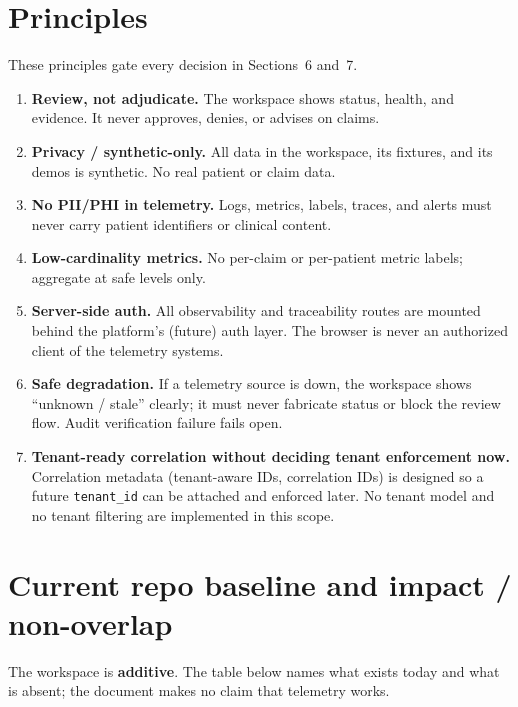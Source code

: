 \documentclass[11pt]{article}
\newcommand{\code}[1]{\texttt{#1}}
\begin{document}
\section{Principles}

These principles gate every decision in Sections~6 and~7.

\begin{enumerate}
\item \textbf{Review, not adjudicate.} The workspace shows status, health,
      and evidence. It never approves, denies, or advises on claims.
\item \textbf{Privacy / synthetic-only.} All data in the workspace, its
      fixtures, and its demos is synthetic. No real patient or claim data.
\item \textbf{No PII/PHI in telemetry.} Logs, metrics, labels, traces, and
      alerts must never carry patient identifiers or clinical content.
\item \textbf{Low-cardinality metrics.} No per-claim or per-patient metric
      labels; aggregate at safe levels only.
\item \textbf{Server-side auth.} All observability and traceability routes are
      mounted behind the platform's (future) auth layer. The browser is never
      an authorized client of the telemetry systems.
\item \textbf{Safe degradation.} If a telemetry source is down, the workspace
      shows ``unknown / stale'' clearly; it must never fabricate status or
      block the review flow. Audit verification failure fails open.
\item \textbf{Tenant-ready correlation without deciding tenant enforcement
      now.} Correlation metadata (tenant-aware IDs, correlation IDs) is
      designed so a future \code{tenant\_id} can be attached and enforced
      later. No tenant model and no tenant filtering are implemented in this
      scope.
\end{enumerate}

\section{Current repo baseline and impact / non-overlap}

The workspace is \textbf{additive}. The table below names what exists today and
what is absent; the document makes no claim that telemetry works.
\end{document}
